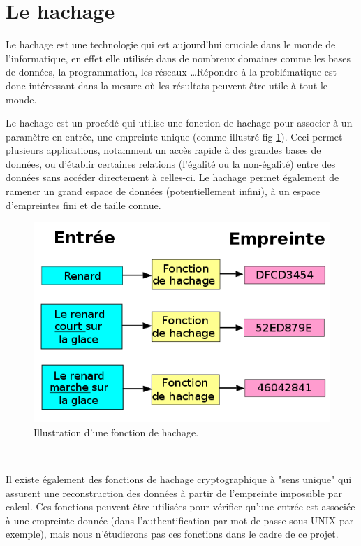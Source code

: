 \documentclass[final,twoside,twocolumn,10pt]{scrartcl}
\begin{document}
\section{Le hachage}
	Le hachage est une technologie qui est aujourd’hui cruciale dans le monde de l’informatique, en effet elle utilisée dans de nombreux domaines comme les bases de données, la programmation, les réseaux \ldots Répondre à la problématique est donc intéressant dans la mesure où les résultats peuvent être utile à tout le monde.\\
	\par Le hachage est un procédé qui utilise une fonction de hachage pour associer à un paramètre en entrée, une empreinte unique (comme illustré fig \ref{fig:1}). Ceci permet plusieurs applications, notamment un accès rapide à des grandes bases de données, ou d'établir certaines relations (l'égalité ou la non-égalité) entre des données sans accéder directement à celles-ci. Le hachage permet également de ramener un grand espace de données (potentiellement infini), à un espace d'empreintes fini et de taille connue.\\
	\begin{figure}%
		\begin{center}
			\includegraphics[scale=0.3]{figures/hash}
		\end{center}
		\caption{Illustration d'une fonction de hachage.}
		\label{fig:1}
	\end{figure}\\
	\par Il existe également des fonctions de hachage cryptographique à "sens unique" qui assurent une reconstruction des données à partir de l'empreinte impossible par calcul. Ces fonctions peuvent être utilisées pour vérifier qu'une entrée est associée à une empreinte donnée (dans l'authentification par mot de passe sous UNIX par exemple), mais nous n'étudierons pas ces fonctions dans le cadre de ce projet.
	
\end{document}
